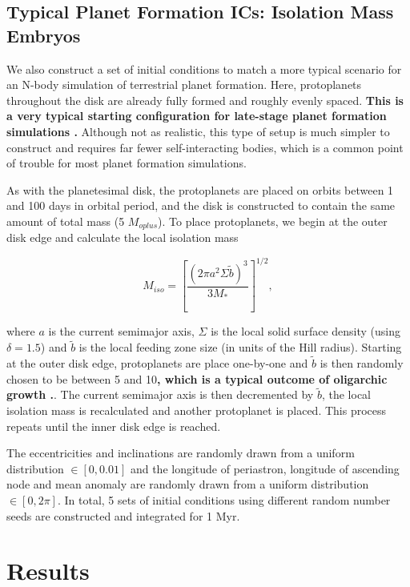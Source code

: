 \subsection{Typical Planet Formation ICs: Isolation Mass Embryos}

We also construct a set of initial conditions to match a more typical scenario for an N-body simulation of terrestrial planet formation. Here, protoplanets throughout the disk are already fully formed and roughly evenly spaced. \textbf{This is a very typical starting configuration for late-stage planet formation simulations \cite{kokubo02, raymond05, raymond06}.} Although not as realistic, this type of setup is much simpler to construct and requires far fewer self-interacting bodies, which is a common point of trouble for most planet  formation simulations.

As with the planetesimal disk, the protoplanets are placed on orbits between 1 and 100 days in orbital period, and the disk is constructed to contain the same amount of total mass (5 $M_{oplus}$). To place protoplanets, we begin at the outer disk edge and calculate the local isolation mass \cite{kokubo02}

\begin{equation}\label{eq:iso}
	M_{iso} = \left[ \frac{\left( 2 \pi a^2 \Sigma \tilde{b} \right)^3}{3 M_{*}} \right]^{1/2},
\end{equation}

\noindent where $a$ is the current semimajor axis, $\Sigma$ is the local solid surface density (using $\delta = 1.5$) and $\tilde{b}$ is the local feeding zone size (in units of the Hill radius). Starting at the outer disk edge, protoplanets are place one-by-one and $\tilde{b}$ is then randomly chosen to be between 5 and 10\textbf{, which is a typical outcome of oligarchic growth \cite{kokubo02}.}. The current semimajor axis is then decremented by $\tilde{b}$, the local isolation mass is recalculated and another protoplanet is placed. This process repeats until the inner disk edge is reached.

The eccentricities and inclinations are randomly drawn from a uniform distribution $\in \left[ 0, 0.01 \right]$ and the longitude of periastron, longitude of ascending node and mean anomaly are randomly drawn from a uniform distribution $\in \left[ 0, 2 \pi \right]$. In total, 5 sets of initial conditions using different random number seeds are constructed and integrated for 1 Myr.

\section{Results} \label{sec:results}

